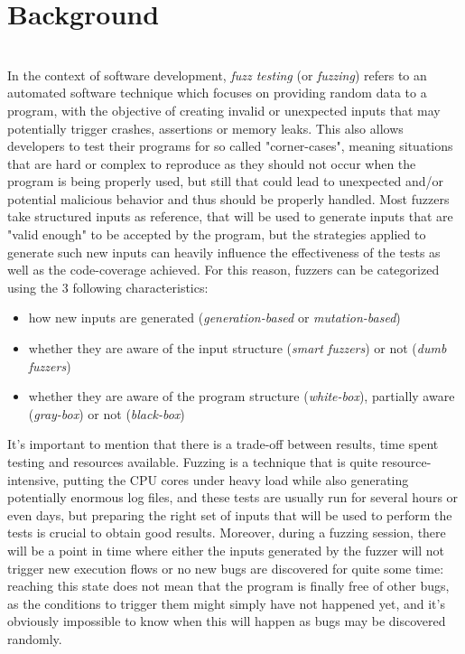 \documentclass[Lau,oneside]{sapthesis}%
\begin{document}
\chapter{Background}
\ \\
In the context of software development, \textit{fuzz testing} (or \textit{fuzzing}) refers to an automated software technique which focuses on providing random data to a program, with the objective of creating invalid or unexpected inputs that may potentially trigger crashes, assertions or memory leaks.
\newline 
This also allows developers to test their programs for so called "corner-cases", meaning situations that are hard or complex to reproduce as they should not occur when the program is being properly used, but still that could lead to unexpected and/or potential malicious behavior and thus should be properly handled. 
\newline \newline
Most fuzzers take structured inputs as reference, that will be used to generate inputs that are "valid enough" to be accepted by the program, but the strategies applied to generate such new inputs can heavily influence the effectiveness of the tests as well as the code-coverage achieved.
\newline
For this reason, fuzzers can be categorized using the 3 following characteristics:
\begin{itemize}
    \item how new inputs are generated (\textit{generation-based} or \textit{mutation-based})
    \item whether they are aware of the input structure (\textit{smart fuzzers}) or not (\textit{dumb fuzzers})
    \item whether they are aware of the program structure (\textit{white-box}), partially aware (\textit{gray-box}) or not (\textit{black-box})
\end{itemize}
It's important to mention that there is a trade-off between results, time spent testing and resources available.
\newline
Fuzzing is a technique that is quite resource-intensive, putting the CPU cores under heavy load while also generating potentially enormous log files, and these tests are usually run for several hours or even days, but preparing the right set of inputs that will be used to perform the tests is crucial to obtain good results.
\newline
Moreover, during a fuzzing session, there will be a point in time where either the inputs generated by the fuzzer will not trigger new execution flows or no new bugs are discovered for quite some time: reaching this state does not mean that the program is finally free of other bugs, as the conditions to trigger them might simply have not happened yet, and it's obviously impossible to know when this will happen as bugs may be discovered randomly.
\end{document}
